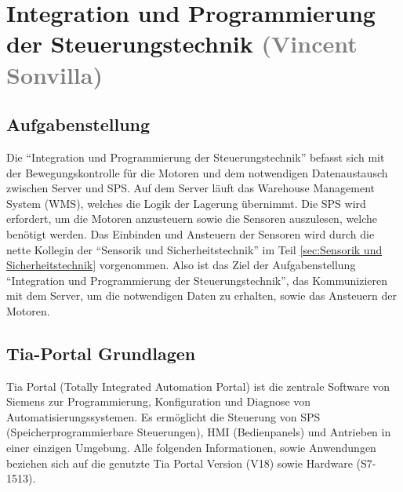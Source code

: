 \section{Integration und Programmierung der Steuerungstechnik \textcolor{gray}{ (Vincent Sonvilla)}}


\subsection{Aufgabenstellung}
Die \enquote{Integration und Programmierung der Steuerungstechnik} befasst sich mit der Bewegungskontrolle für die Motoren und dem notwendigen Datenaustausch zwischen Server und SPS. Auf dem Server läuft das Warehouse Management System (WMS), welches die Logik der Lagerung übernimmt. Die SPS wird erfordert, um die Motoren anzusteuern sowie die Sensoren auszulesen, welche benötigt werden. Das Einbinden und Ansteuern der Sensoren wird durch die nette Kollegin der \enquote{Sensorik und Sicherheitstechnik} im Teil \ref{sec:Sensorik und Sicherheitstechnik} vorgenommen. Also ist das Ziel der Aufgabenstellung \enquote{Integration und Programmierung der Steuerungstechnik}, das Kommunizieren mit dem Server, um die notwendigen Daten zu erhalten, sowie das Ansteuern der Motoren. 

\subsection{Tia-Portal Grundlagen}

Tia Portal (Totally Integrated Automation Portal) ist die zentrale Software von Siemens zur Programmierung, Konfiguration und Diagnose von Automatisierungssystemen. Es ermöglicht die Steuerung von SPS (Speicherprogrammierbare Steuerungen), HMI (Bedienpanels) und Antrieben in einer einzigen Umgebung. Alle folgenden Informationen, sowie Anwendungen beziehen sich auf die genutzte Tia Portal Version (V18) sowie Hardware (S7-1513).

